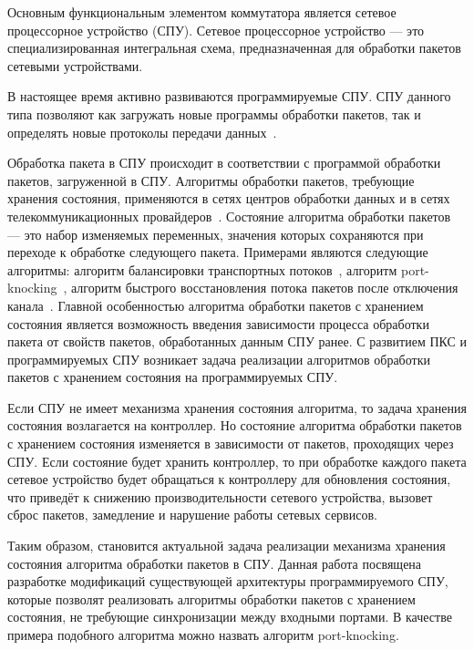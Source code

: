 \documentclass[conference]{IEEEtran}
\begin{document}
Основным функциональным элементом коммутатора является сетевое процессорное
устройство (СПУ).
Сетевое процессорное устройство --- это специализированная
интегральная схема, предназначенная для обработки пакетов сетевыми
устройствами.

В настоящее время активно развиваются программируемые СПУ. СПУ данного типа
позволяют как загружать новые программы обработки пакетов, так и определять
новые протоколы передачи данных~\cite{bib:Volkanov:NPUApproach}.

Обработка пакета в СПУ происходит в соответствии с программой обработки
пакетов, загруженной в СПУ.
Алгоритмы обработки пакетов, требующие хранения состояния,
применяются в сетях центров обработки данных и в сетях телекоммуникационных
провайдеров~\cite{bib:Bifulco:progDataPlane}. Состояние алгоритма
обработки пакетов --- это набор изменяемых переменных, значения которых
сохраняются при переходе к обработке следующего пакета.
Примерами являются следующие алгоритмы: алгоритм балансировки транспортных
потоков~\cite{bib:Cascone:management}, алгоритм
port-knocking~\cite{bib:Bianchi:OpenState}, алгоритм быстрого восстановления
потока пакетов после отключения канала~\cite{bib:Cascone:management}.
Главной особенностью алгоритма обработки пакетов с хранением состояния
является возможность введения зависимости процесса
обработки пакета от свойств пакетов, обработанных данным СПУ ранее.
С развитием ПКС и программируемых СПУ возникает задача реализации
алгоритмов обработки пакетов с хранением состояния на программируемых СПУ.

Если СПУ не имеет механизма хранения состояния алгоритма, то задача хранения
состояния
возлагается на контроллер. Но состояние алгоритма обработки пакетов с
хранением состояния изменяется в зависимости от
пакетов, проходящих через СПУ. Если состояние будет хранить контроллер, то
при обработке каждого пакета сетевое устройство будет обращаться к контроллеру
для обновления состояния, что приведёт к снижению производительности
сетевого устройства, вызовет сброс пакетов, замедление и нарушение
работы сетевых сервисов.

Таким образом, становится актуальной задача реализации механизма хранения
состояния алгоритма обработки пакетов в СПУ.
Данная работа посвящена разработке модификаций существующей архитектуры
программируемого СПУ, которые позволят реализовать алгоритмы обработки
пакетов с хранением состояния, не требующие синхронизации между входными
портами. В качестве примера подобного алгоритма можно назвать
алгоритм port-knocking.
\end{document}

